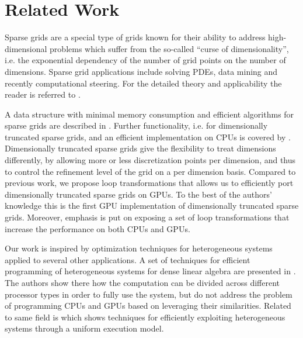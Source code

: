 \section{Related Work}
\label{sec:related_work}
Sparse grids are a special type of grids known for their ability to address
high-dimensional problems which suffer from the so-called ``curse of
dimensionality'', i.e. the exponential dependency of the number of grid points
on the number of dimensions. Sparse grid applications include solving PDEs, data mining
and recently computational steering. For the detailed theory and applicability the 
reader is referred to \cite{CambridgeJournals:227245}.

A data structure with minimal memory consumption and efficient
algorithms for sparse grids are described in 
\cite{Murarasu:2011:CDS:1941553.1941559}. Further functionality, i.e. for dimensionally
truncated sparse grids, and an efficient implementation on CPUs is covered by \cite{murarasu12fastsg:}.
Dimensionally truncated sparse grids give the flexibility to treat dimensions differently, 
by allowing more or less discretization points per dimension, and thus to control the refinement level of the grid
on a per dimension basis. Compared to previous work, we propose loop transformations that allows us to 
efficiently port dimensionally truncated sparse grids on GPUs. To the best of the authors' knowledge this is the first
GPU implementation of dimensionally truncated sparse grids. Moreover, emphasis is put on exposing a set 
of loop transformations that increase the performance on both CPUs and GPUs.

Our work is inspired by optimization techniques for heterogeneous systems
applied to several other applications. A set of techniques for
efficient programming of heterogeneous systems for dense linear algebra
are presented in \cite{Tomov:2010:TDL:1805333.1805388}. The authors show there how the computation 
can be divided across different processor types in order to fully use the system, but do not address 
the problem of programming CPUs and GPUs based on leveraging their similarities.
Related to same field is \cite{Augonnet:2011:SUP:1951453.1951454} which shows techniques for efficiently
exploiting heterogeneous systems through a uniform execution model.

